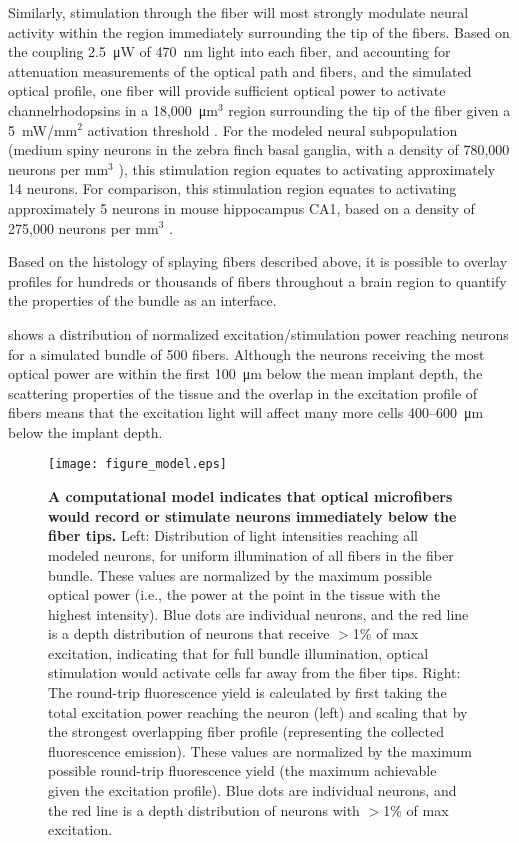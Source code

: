 Similarly, stimulation through the fiber will most strongly 
modulate neural activity within the region immediately 
surrounding the tip of the fibers. Based on the coupling 
2.5~\si{\micro\watt} of 470~nm light into each fiber, and accounting for 
attenuation measurements of the optical path and fibers, and 
the simulated optical profile, one fiber will provide sufficient 
optical power to activate channelrhodopsins in a 18,000~\si{\micro\meter}$^3$ 
region surrounding the tip of the fiber given a 5~mW/mm$^2$ 
activation threshold \cite{Yizhar:2011jv}. For the modeled neural 
subpopulation (medium spiny neurons in the zebra finch basal 
ganglia, with a density of 780,000 neurons per mm$^3$ 
\cite{KosubekLanger:2017jb}), this stimulation region equates 
to activating approximately 14 neurons. 
For comparison, this stimulation region equates to activating 
approximately 5 neurons in mouse hippocampus CA1, based on a 
density of 275,000 neurons per mm$^3$ 
\cite{AyberkKurt:2004jg,Richards:2013fe}.

Based on the histology of splaying fibers described above, it is 
possible to overlay profiles for hundreds or thousands of fibers 
throughout a brain region to quantify the properties of the 
bundle as an interface.

 shows a distribution of normalized 
excitation/stimulation power reaching neurons for a simulated bundle of 
500 fibers. Although the neurons receiving the most optical 
power are within the first 100~\si{\micro\meter} below the mean implant depth, the 
scattering properties of the tissue and the overlap in the 
excitation profile of fibers means that the excitation 
light will affect many more cells 400--600~\si{\micro\meter} 
below the implant depth.

\begin{figure}
\texttt{[image: figure\_model.eps]}
\caption[Distribution of neurons accessible via fiber 
bundle.]{\textbf{A computational model indicates that 
optical microfibers would record or 
stimulate neurons immediately below the fiber tips.} 
Left: Distribution of light intensities reaching all 
modeled neurons, for uniform illumination of all fibers 
in the fiber bundle. These values are normalized by the 
maximum possible optical power (i.e., the power at the 
point in the tissue with the highest intensity). Blue 
dots are individual neurons, and the red line is a 
depth distribution of neurons that receive $>$1\% of max 
excitation, indicating that for full bundle illumination, 
optical stimulation would activate cells far away from 
the fiber tips. Right: The round-trip fluorescence yield 
is calculated by first taking the total excitation power 
reaching the neuron (left) and scaling that by the 
strongest overlapping fiber profile (representing the 
collected fluorescence emission). These values are 
normalized by the maximum possible round-trip 
fluorescence yield (the maximum achievable given the 
excitation profile). Blue dots are individual neurons, 
and the red line is a depth distribution of neurons with 
$>$1\% of max excitation.}
\label{fig:model}
\end{figure}

